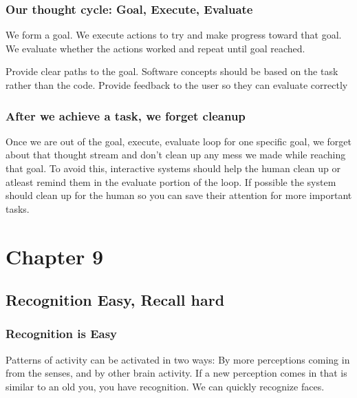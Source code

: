 \documentclass[11pt,]{article}
\begin{document}
\hypertarget{our-thought-cycle-goal-execute-evaluate}{%
\subsubsection{Our thought cycle: Goal, Execute,
Evaluate}\label{our-thought-cycle-goal-execute-evaluate}}

We form a goal. We execute actions to try and make progress toward that
goal. We evaluate whether the actions worked and repeat until goal
reached.

Provide clear paths to the goal. Software concepts should be based on
the task rather than the code. Provide feedback to the user so they can
evaluate correctly

\hypertarget{after-we-achieve-a-task-we-forget-cleanup}{%
\subsubsection{After we achieve a task, we forget
cleanup}\label{after-we-achieve-a-task-we-forget-cleanup}}

Once we are out of the goal, execute, evaluate loop for one specific
goal, we forget about that thought stream and don't clean up any mess we
made while reaching that goal. To avoid this, interactive systems should
help the human clean up or atleast remind them in the evaluate portion
of the loop. If possible the system should clean up for the human so you
can save their attention for more important tasks.

\hypertarget{chapter-9}{%
\section{Chapter 9}\label{chapter-9}}

\hypertarget{recognition-easy-recall-hard}{%
\subsection{Recognition Easy, Recall
hard}\label{recognition-easy-recall-hard}}

\hypertarget{recognition-is-easy}{%
\subsubsection{Recognition is Easy}\label{recognition-is-easy}}

Patterns of activity can be activated in two ways: By more perceptions
coming in from the senses, and by other brain activity. If a new
perception comes in that is similar to an old you, you have recognition.
We can quickly recognize faces.
\end{document}
